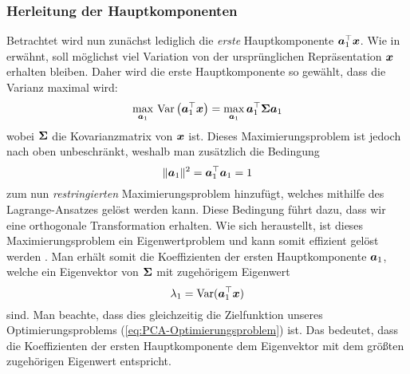 \subsubsection{Herleitung der Hauptkomponenten}
\label{ch:MethodenDerDimRed:statistisch:PCA:HerleitungPC}
Betrachtet wird nun zunächst lediglich die \textit{erste} Hauptkomponente $\bm{a}_1^\top \bm{x}$. Wie in  erwähnt, soll möglichst viel Variation von der ursprünglichen Repräsentation $\bm{x}$ erhalten bleiben. Daher wird die erste Hauptkomponente so gewählt, dass die Varianz maximal wird:
\begin{equation}
	\label{eq:PCA-Optimierungsproblem}
	\max_{\bm{a}_1}\, \operatorname{Var} \left( \bm{a}_1^\top \bm{x} \right) = \max_{\bm{a}_1} \bm{a}_1^\top \mathbf{\Sigma} \bm{a}_1
\end{equation}
wobei $\mathbf{\Sigma}$ die Kovarianzmatrix von $\bm{x}$ ist. Dieses Maximierungsproblem ist jedoch nach oben unbeschränkt, weshalb man zusätzlich die Bedingung
\begin{equation}
	\lVert \bm{a}_1 \rVert^2 = \bm{a}_1^\top \bm{a}_1 = 1
\end{equation}
zum nun \textit{restringierten} Maximierungsproblem hinzufügt, welches mithilfe des Lagrange-Ansatzes gelöst werden kann. Diese Bedingung führt dazu, dass wir eine orthogonale Transformation erhalten. Wie sich heraustellt, ist dieses Maximierungsproblem ein Eigenwertproblem und kann somit effizient gelöst werden \parencite[vgl.][4 -- 6]{Jolliffe.2002}. Man erhält somit die Koeffizienten
der ersten Hauptkomponente $\bm{a}_1$, welche ein Eigenvektor von $\mathbf{\Sigma}$ mit zugehörigem
Eigenwert
\begin{equation}
	\lambda_1 = \operatorname{Var}(\bm{a}_1^\top \bm{x})
\end{equation}
sind. Man beachte, dass dies gleichzeitig die Zielfunktion unseres Optimierungsproblems (\eqref{eq:PCA-Optimierungsproblem}) ist. Das bedeutet, dass die Koeffizienten der ersten Hauptkomponente dem Eigenvektor mit dem größten zugehörigen Eigenwert entspricht.

